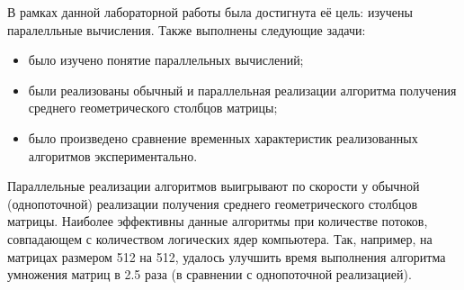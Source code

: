 \Conclusion
    В рамках данной лабораторной работы была достигнута её цель: изучены паралелльные вычисления. Также выполнены следующие задачи:

    \begin{itemize}
    	\item было изучено понятие параллельных вычислений;
    	\item были реализованы обычный и  параллельная реализации алгоритма получения среднего геометрического столбцов матрицы;
    	\item было произведено сравнение временных характеристик реализованных алгоритмов экспериментально.
    \end{itemize}
    
    Параллельные реализации алгоритмов выигрывают по скорости у обычной (однопоточной) реализации получения среднего геометрического столбцов матрицы. Наиболее эффективны данные алгоритмы при количестве потоков, совпадающем с количеством логических ядер компьютера. Так, например, на матрицах размером 512 на 512, удалось улучшить время выполнения алгоритма умножения матриц в 2.5 раза (в сравнении с однопоточной реализацией).
